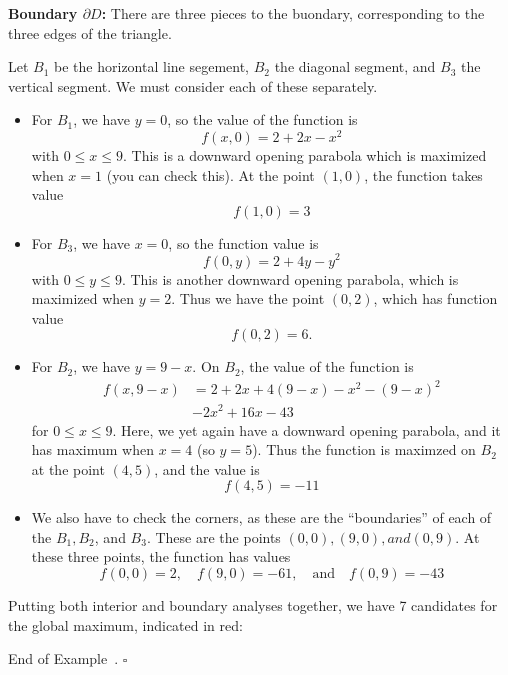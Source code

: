 \documentclass[10pt]{article}
\theoremstyle{definition}
\newtheorem{example}[theorem]{Example}
\renewenvironment{example}
{\begin{oldexample}}
  {\par\smallskip\hfill   End of Example~\theexample. $\square$    \par\end{oldexample}}
\newcommand{\fl}{\noindent\textbf} %
\newcommand{\1}[1]{\textbf{1}_{\left[#1\right]}} %
\begin{document}
\begin{example}
  \fl{Boundary $\partial D$:} There are three pieces to the buondary,
  corresponding to the three edges of the triangle.

  Let $B_{1}$ be the horizontal line segement, $B_{2}$ the diagonal segment,
  and $B_{3}$ the vertical segment. We must consider each of these separately.

  \begin{itemize}
    \item For $B_{1}$, we have $y=0$, so the value of the function is
    \begin{equation*}
      f(x,0) = 2+2x-x^{2}
    \end{equation*}
    with $0 \leq x \leq 9$.
    This is a downward opening parabola which is maximized when $x=1$ (you can
    check this). At the point $(1,0)$, the function takes value
    \begin{equation*}
      f(1,0) = 3
    \end{equation*}
    \item For $B_{3}$, we have $x=0$, so the function value is
    \begin{equation*}
      f(0,y) =2+ 4y-y^{2}
    \end{equation*}
    with $0 \leq y \leq 9$. This is another downward opening parabola, which
    is maximized when $y=2$. Thus we have the point $(0,2)$, which has
    function value
    \begin{equation*}
      f(0,2) = 6.
    \end{equation*}
    
    \item For $B_{2}$, we have $y=9-x$. On $B_{2}$, the value of the function
    is
    \begin{align*}
      f(x,9-x) 
      &= 2+2x+4(9-x)-x^{2} - (9-x)^{2}\\
      &-2x^{2}+16x-43
    \end{align*}
    for $0 \leq x \leq 9$. Here, we yet again have a downward opening
    parabola, and it has maximum when $x=4$ (so $y=5$). Thus the function is
    maximzed on $B_{2}$ at the point $(4,5)$, and the value is
    \begin{equation*}
      f(4,5) = -11
    \end{equation*}
    \item We also have to check the corners, as these are the ``boundaries''
    of each of the $B_{1},B_{2}$, and $B_{3}$. These are the points $(0,0),
    (9,0), and (0,9)$. At these three points, the function has values
    \begin{equation*}
      f(0,0) = 2, \quad f(9,0)=-61, \quad \text{and} \quad f(0,9) = -43
    \end{equation*}
  \end{itemize}
  Putting both interior and boundary analyses together, we have 7 candidates
  for the global maximum, indicated in red:
  \begin{center}
\end{center}
\end{example}
\end{document}
